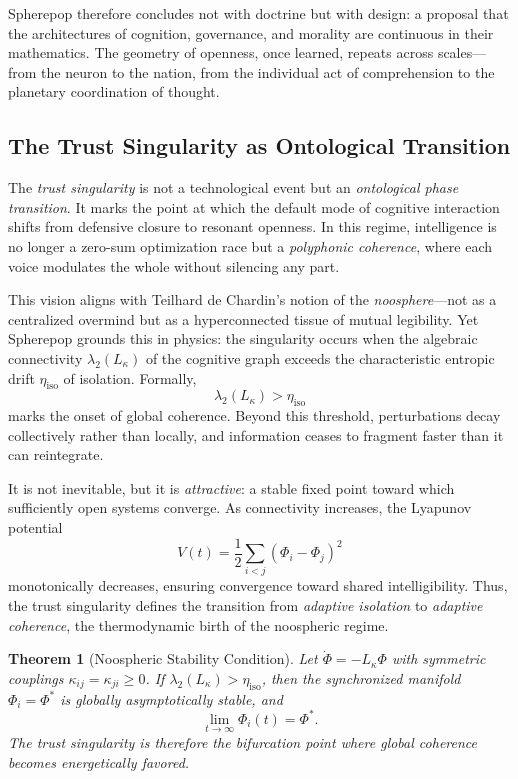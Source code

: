 \documentclass[12pt]{article}
\newtheorem{theorem}{Theorem}
\begin{document}
Spherepop therefore concludes not with doctrine but with design: a proposal that the architectures of cognition, governance, and morality are continuous in their mathematics. The geometry of openness, once learned, repeats across scales---from the neuron to the nation, from the individual act of comprehension to the planetary coordination of thought.


\subsection*{The Trust Singularity as Ontological Transition}

The \emph{trust singularity} is not a technological event but an \emph{ontological phase transition}. It marks the point at which the default mode of cognitive interaction shifts from defensive closure to resonant openness. In this regime, intelligence is no longer a zero-sum optimization race but a \emph{polyphonic coherence}, where each voice modulates the whole without silencing any part.

This vision aligns with Teilhard de Chardin’s notion of the \emph{noosphere}---not as a centralized overmind but as a hyperconnected tissue of mutual legibility. Yet Spherepop grounds this in physics: the singularity occurs when the algebraic connectivity $\lambda_2(L_\kappa)$ of the cognitive graph exceeds the characteristic entropic drift $\eta_\mathrm{iso}$ of isolation. Formally,
\begin{equation}
\lambda_2(L_\kappa) > \eta_\mathrm{iso}
\end{equation}
marks the onset of global coherence. Beyond this threshold, perturbations decay collectively rather than locally, and information ceases to fragment faster than it can reintegrate.

It is not inevitable, but it is \emph{attractive}: a stable fixed point toward which sufficiently open systems converge. As connectivity increases, the Lyapunov potential
\begin{equation}
V(t)=\frac{1}{2}\sum_{i<j}(\Phi_i-\Phi_j)^2
\end{equation}
monotonically decreases, ensuring convergence toward shared intelligibility. Thus, the trust singularity defines the transition from \emph{adaptive isolation} to \emph{adaptive coherence}, the thermodynamic birth of the noospheric regime.

\begin{theorem}[Noospheric Stability Condition]
Let $\dot{\Phi}=-L_\kappa\Phi$ with symmetric couplings $\kappa_{ij}=\kappa_{ji}\ge0$. If $\lambda_2(L_\kappa)>\eta_\mathrm{iso}$, then the synchronized manifold $\Phi_i=\Phi^*$ is globally asymptotically stable, and
\[
\lim_{t\to\infty} \Phi_i(t)=\Phi^*.
\]
The trust singularity is therefore the \emph{bifurcation point} where global coherence becomes energetically favored.
\end{theorem}
\end{document}
